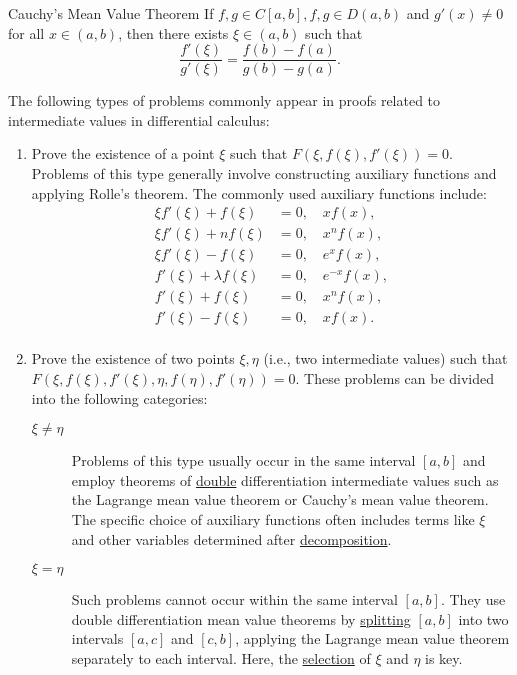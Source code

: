 \documentclass[11pt]{../../TexTemplate/elegantbook}
\begin{document}
\begin{theorem}{Cauchy's Mean Value Theorem}
    If \(f,g\in C[a,b], f,g\in D(a,b)\) and \(g'(x) \neq 0\) for all \(x\in (a,b)\), 
    then there exists \(\xi\in (a,b)\) such that
    \[
        \frac{f'(\xi)}{g'(\xi)} = \frac{f(b) - f(a)}{g(b) - g(a)}.
    \]
\end{theorem}


\vspace{0.7cm}
\begin{note}
The following types of problems commonly appear in proofs related to intermediate values in differential calculus:
\begin{enumerate}
    \item Prove the existence of a point \(\xi\) such that \(F(\xi, f(\xi), f'(\xi)) = 0\).
        Problems of this type generally involve constructing auxiliary functions and applying Rolle's theorem. 
        The commonly used auxiliary functions include:
        \[
        \begin{aligned}
        \xi f'(\xi) + f(\xi) &= 0, \quad x f(x), \\
        \xi f'(\xi) + nf(\xi) &= 0, \quad x^n f(x), \\
        \xi f'(\xi) - f(\xi) &= 0, \quad e^x f(x), \\
        f'(\xi) + \lambda f(\xi) &= 0, \quad e^{-x} f(x), \\
        f'(\xi) + f(\xi) &= 0, \quad x^n f(x), \\
        f'(\xi) - f(\xi) &= 0, \quad x f(x). \\
        \end{aligned}
        \]
    
    \item Prove the existence of two points \(\xi, \eta\) (i.e., two intermediate values) 
        such that \(F(\xi, f(\xi), f'(\xi), \eta, f(\eta), f'(\eta)) = 0\).
        These problems can be divided into the following categories:
        \begin{description}
            \item [\(\xi \neq \eta\)] Problems of this type usually occur in the same interval \([a, b]\) and 
                employ theorems of \underline{double} differentiation intermediate values 
                such as the Lagrange mean value theorem or Cauchy's mean value theorem. 
                The specific choice of auxiliary functions often includes terms like \(\xi\) and 
                other variables determined after \underline{decomposition}.
            \item [\(\xi = \eta\)] Such problems cannot occur within the same interval \([a, b]\). 
                They use double differentiation mean value theorems by \underline{splitting} \([a, b]\) into 
                two intervals \([a,c]\) and \([c,b]\), 
                applying the Lagrange mean value theorem separately to each interval. 
                Here, the \underline{selection} of \(\xi\) and \(\eta\) is key.
        \end{description}


\end{enumerate}
\end{note}
\end{document}
